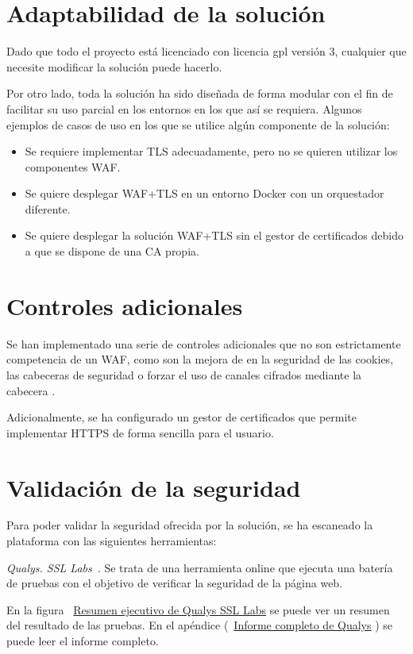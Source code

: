 \section{Adaptabilidad de la solución}
\par Dado que todo el proyecto está licenciado con licencia \acrlong{gpl} versión 3, cualquier que necesite modificar la solución puede hacerlo.
\par Por otro lado, toda la solución ha sido diseñada de forma modular con el fin de facilitar su uso parcial en los entornos en los que así se requiera. Algunos ejemplos de casos de uso en los que se utilice algún componente de la solución: 
\begin{itemize}
\item Se requiere implementar TLS adecuadamente, pero no se quieren utilizar los componentes WAF.
\item Se quiere desplegar WAF+TLS en un entorno Docker con un orquestador diferente.
\item Se quiere desplegar la solución WAF+TLS sin el gestor de certificados debido a que se dispone de una CA propia.
\end{itemize}

\section{Controles adicionales}
\par Se han implementado una serie de controles adicionales que no son estrictamente competencia de un WAF, como son la mejora de en la seguridad de las cookies, las cabeceras de seguridad o forzar el uso de canales
cifrados mediante la cabecera \cite{wiki:hsts}.
\par Adicionalmente, se ha configurado un gestor de certificados que permite implementar HTTPS de forma sencilla para el usuario.

\section{Validación de la seguridad}
Para poder validar la seguridad ofrecida por la solución, se ha escaneado la plataforma con las siguientes herramientas:
\par {\em Qualys. SSL Labs~\cite{ssllabs}}. Se trata de una herramienta online que ejecuta una batería de pruebas con el objetivo de verificar la seguridad de la página web.
\par En la figura ~\hyperref[tabla:resumenqualys]{Resumen ejecutivo de Qualys SSL Labs} se puede ver un resumen del resultado de las pruebas. En el apéndice
(~\hyperref[tabla:informequalys]{Informe completo de Qualys} ) se puede leer el informe completo.

